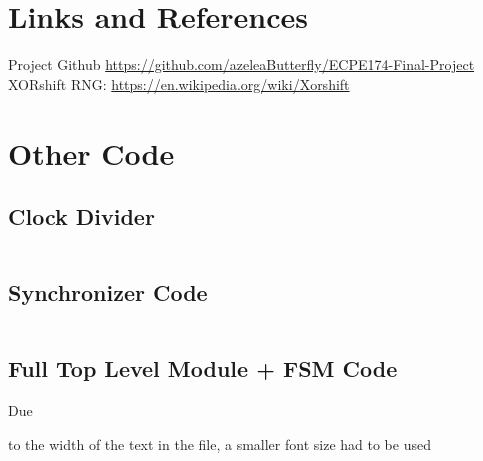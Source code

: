 \documentclass{report}
\begin{document}
\chapter{Links and References}
Project Github \url{https://github.com/azeleaButterfly/ECPE174-Final-Project}
XORshift RNG: \url{https://en.wikipedia.org/wiki/Xorshift}
\newpage

\appendix
\chapter{Other Code}
\section{Clock Divider}
\inputminted{sv}{../clockdiv.sv}
\section{Synchronizer Code}
\inputminted{sv}{../synchronizer.sv}
\section{Full Top Level Module + FSM Code}
\hypertarget{fsm_code}{Due} to the width of the text in the file, a smaller font size had to be used
\scriptsize{\inputminted{sv}{../game.sv}}
\end{document}
